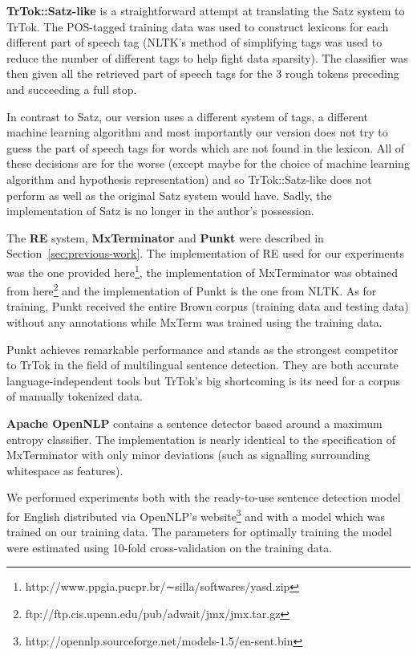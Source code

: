 \textbf{TrTok::Satz-like} is a straightforward attempt at translating
the Satz system to TrTok. The POS-tagged training data was used to
construct lexicons for each different part of speech tag (NLTK's
method of simplifying tags was used to reduce the number of different
tags to help fight data sparsity). The classifier was then given all
the retrieved part of speech tags for the 3 rough tokens preceding and
succeeding a full stop.

In contrast to Satz, our version uses a different system of tags, a
different machine learning algorithm and most importantly our version
does not try to guess the part of speech tags for words which are not
found in the lexicon. All of these decisions are for the worse (except
maybe for the choice of machine learning algorithm and hypothesis
representation) and so TrTok::Satz-like does not perform as well as
the original Satz system would have. Sadly, the implementation of Satz
is no longer in the author's possession.

The \textbf{RE} system, \textbf{MxTerminator} and \textbf{Punkt} were
described in Section~\ref{sec:previous-work}. The implementation of RE
used for our experiments was the one provided
here\footnote{http://www.ppgia.pucpr.br/∼silla/softwares/yasd.zip},
the implementation of MxTerminator was obtained from
here\footnote{ftp://ftp.cis.upenn.edu/pub/adwait/jmx/jmx.tar.gz} and
the implementation of Punkt is the one from NLTK. As for training,
Punkt received the entire Brown corpus (training data and testing
data) without any annotations while MxTerm was trained using the
training data.

Punkt achieves remarkable performance and stands as the strongest
competitor to TrTok in the field of multilingual sentence detection.
They are both accurate language-independent tools but TrTok's big
shortcoming is its need for a corpus of manually tokenized data.

\textbf{Apache OpenNLP} contains a sentence detector based around a
maximum entropy classifier. The implementation is nearly identical to
the specification of MxTerminator with only minor deviations (such as
signalling surrounding whitespace as features).

We performed experiments both with the ready-to-use sentence detection
model for English distributed via OpenNLP's
website\footnote{http://opennlp.sourceforge.net/models-1.5/en-sent.bin}
and with a model which was trained on our training data. The
parameters for optimally training the model were estimated using
10-fold cross-validation on the training data.

